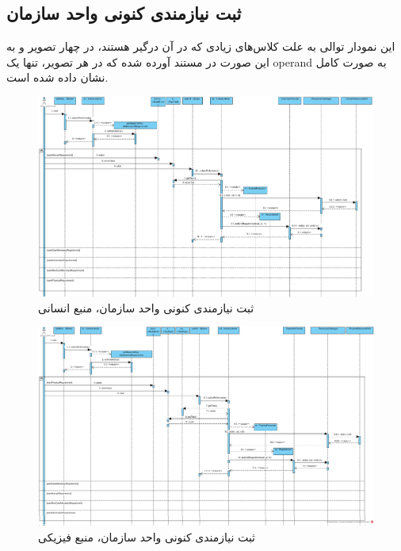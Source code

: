 \newpage
\begin{landscape}
\section{ثبت نیازمندی کنونی واحد سازمان}
این نمودار توالی به علت کلاس‌های زیادی که در آن درگیر هستند، در چهار تصویر و به این صورت در مستند آورده شده که در هر تصویر، تنها یک operand به صورت کامل نشان داده شده است.
\begin{figure}[H]
	\centering
	\includegraphics[scale=0.5]{img/sequence-design/AddRequirementToUnit_HUMAN}
	\caption{ثبت نیازمندی کنونی واحد سازمان، منبع انسانی}
\end{figure}
\begin{figure}[H]
	\centering
	\includegraphics[scale=0.5]{img/sequence-design/AddRequirementToUnit_PHYSICAL}
	\caption{ثبت نیازمندی کنونی واحد سازمان، منبع فیزیکی}
\end{figure}
\begin{figure}[H]
	\centering

\end{figure}
\end{landscape}
